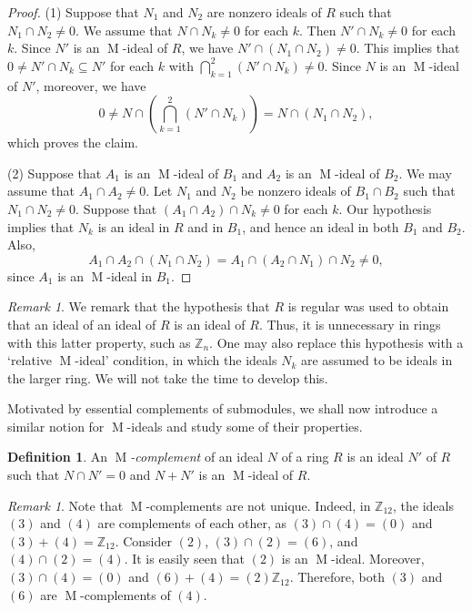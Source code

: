 \documentclass[11pt,leqno]{amsart}
\DeclareMathOperator{\m}{M}
\theoremstyle{definition}
\newtheorem{definition}{Definition}[section]
\theoremstyle{remark}
\newtheorem{remark}[theorem]{Remark}
\numberwithin{equation}{section}
\numberwithin{equation}{section}
\begin{document}
\begin{proof}
(1) 
Suppose that $ N_1$ and $ N_2$ are nonzero ideals of \( R\) such that 
$
N_1\cap N_2 \neq 0.
$
We assume that \( N \cap N_k \neq 0 \) for each \( k  \). Then $N'\cap N_k\neq 0$ for each $k$.
Since \( N'\) is an $\m$-ideal of $R$, we have \(N'\cap \left(  N_1\cap N_2\right)  \neq 0\). This implies that $0\neq  N'\cap N_k\subseteq N'$ for each $k$ with $\bigcap_{k=1}^2(N'\cap N_k)\neq 0.$ Since \( N\) is an $\m$-ideal of $N'$, moreover, we have
\[
0\neq N \cap \left(\bigcap_{k=1}^2 (N'\cap N_k)\right) =N \cap \left( N_1\cap N_2\right),
\]
which proves the claim.

(2) 
Suppose that \( A_1\) is an $\m$-ideal of $B_1$ and \( A_2 \) is an $\m$-ideal of $B_2$.  We may assume that $A_1 \cap A_2 \neq 0$. Let \(N_1\) and \(N_2\) be nonzero ideals of \( B_1 \cap B_2 \) such that \(N_1\cap N_2 \neq 0\). Suppose that \( (A_1 \cap A_2) \cap N_k \neq 0 \) for each \(k\).   
Our hypothesis implies that $N_k$ is an ideal in $R$ and in $B_1$, and hence
an ideal in both \(B_1\) and \(B_2\).
Also, $$A_1 \cap A_2 \cap (N_1\cap N_2) =  A_1 \cap (A_2 \cap N_1) \cap N_2 \neq 0,$$ since $A_1$ is an $\m$-ideal in $B_1$.
\end{proof}

\begin{remark}
We remark that the hypothesis that $R$ is regular was used to obtain that an ideal of an ideal of $R$ is an ideal of $R$.  Thus, it is unnecessary in rings with this latter property, such as $\mathds{Z}_n$.  One may also replace this hypothesis with a `relative $\m$-ideal' condition, in which 
the ideals $N_k$ are assumed to be ideals in the larger ring.  We will not take the time to develop this. 
\end{remark}

Motivated by essential complements of submodules, we shall now introduce a similar notion for $\m$-ideals and study some of their properties.

\begin{definition}
An \emph{$\m$-complement} of an ideal $N$ of a ring $R$ is an ideal $N'$ of $R$ such that $N\cap N'=0$ and $N+N'$ is an $\m$-ideal of $R$.    
\end{definition}

\begin{remark}
Note that $\m$-complements are not unique. Indeed, in $\mathds{Z}_{12}$, the ideals  $(3)$ and $(4)$ are complements of each other, as $(3)\cap (4) =(0)$ and $(3)+ (4)=\mathds{Z}_{12}$. Consider $(2)$,  $(3)\cap (2)=(6)$, and $(4)\cap (2)=(4)$. It is easily seen that $(2)$ is an $\m$-ideal. Moreover, $(3)\cap (4) = (0)$ and $(6)+(4)=(2) \mathds{Z}_{12}$. Therefore, both $(3)$ and $(6)$ are $\m$-complements of $(4)$.    
\end{remark}
\end{document}
